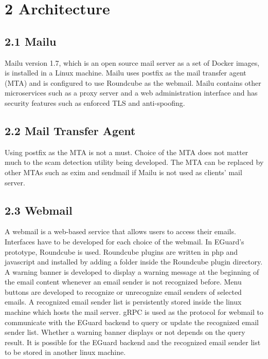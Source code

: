\documentclass[11pt]{article}
\begin{document}

\section*{\large{2 \hspace{10pt} Architecture}}
\subsection*{2.1 \hspace{10pt} Mailu}
Mailu version 1.7, which is an open source mail server as a set of Docker images, is installed in a Linux machine. Mailu uses postfix as the mail transfer agent (MTA) and is configured to use Roundcube as the webmail. Mailu contains other microservices such as a proxy server and a web administration interface and has security features such as enforced TLS and anti-spoofing.

\subsection*{2.2 \hspace{10pt} Mail Transfer Agent}
Using postfix as the MTA is not a must. Choice of the MTA does not matter much to the scam detection utility being developed. The MTA can be replaced by other MTAs such as exim and sendmail if Mailu is not used as clients' mail server. 

\subsection*{2.3 \hspace{10pt} Webmail}
A webmail is a web-based service that allows users to access their emails. Interfaces have to be developed for each choice of the webmail. In EGuard's prototype, Roundcube is used. Roundcube plugins are written in php and javascript and installed by adding a folder inside the Roundcube plugin directory. A warning banner is developed to display a warning message at the beginning of the email content whenever an email sender is not recognized before. Menu buttons are developed to recognize or unrecognize email senders of selected emails. A recognized email sender list is persistently stored inside the linux machine which hosts the mail server. gRPC is used as the protocol for webmail to communicate with the EGuard backend to query or update the recognized email sender list. Whether a warning banner displays or not depends on the query result. It is possible for the EGuard backend and the recognized email sender list to be stored in another linux machine.
\end{document}
